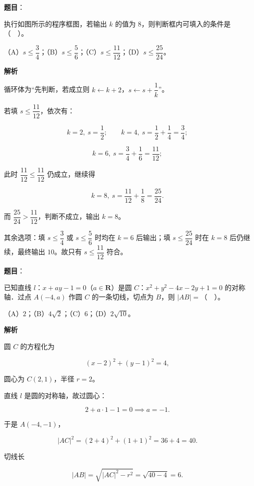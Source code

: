 \begin{answer}

\textbf{题目}：

执行如图所示的程序框图，若输出 $k$ 的值为 $8$，则判断框内可填入的条件是（　）。
\nopagebreak[4]
\begin{center}\end{center}
\nopagebreak[4]
（A）$s\le\dfrac{3}{4}$；（B）$s\le\dfrac{5}{6}$；（C）$s\le\dfrac{11}{12}$；（D）$s\le\dfrac{25}{24}$。

\textbf{解析}

循环体为“先判断，若成立则 $k\leftarrow k+2$，$s\leftarrow s+\dfrac{1}{k}$”。

若填 $s\le\dfrac{11}{12}$，依次有：

\nopagebreak[4]
\[
k=2,\ s=\frac{1}{2};\qquad
k=4,\ s=\frac{1}{2}+\frac{1}{4}=\frac{3}{4};
\]

\nopagebreak[4]
\[
k=6,\ s=\frac{3}{4}+\frac{1}{6}=\frac{11}{12};
\]

此时 $\dfrac{11}{12}\le\dfrac{11}{12}$ 仍成立，继续得

\nopagebreak[4]
\[
k=8,\ s=\frac{11}{12}+\frac{1}{8}=\frac{25}{24}.
\]

而 $\dfrac{25}{24}>\dfrac{11}{12}$，判断不成立，输出 $k=8$。

其余选项：填 $s\le\dfrac{3}{4}$ 或 $s\le\dfrac{5}{6}$ 时均在 $k=6$ 后输出；填 $s\le\dfrac{25}{24}$ 时在 $k=8$ 后仍继续，最终输出 $10$。故只有 $s\le\dfrac{11}{12}$ 符合。


\end{answer}
\begin{answer}

\textbf{题目}：

已知直线 $l$：$x+ay-1=0$（$a\in\mathbf{R}$）是圆 $C$：$x^{2}+y^{2}-4x-2y+1=0$ 的对称轴．过点 $A(-4,a)$ 作圆 $C$ 的一条切线，切点为 $B$，则 $|AB|=$（　）。

（A）$2$；（B）$4\sqrt{2}$；（C）$6$；（D）$2\sqrt{10}$。

\textbf{解析}

圆 $C$ 的方程化为

\nopagebreak[4]
\[
(x-2)^{2}+(y-1)^{2}=4,
\]

圆心为 $C(2,1)$，半径 $r=2$。

直线 $l$ 是圆的对称轴，故过圆心：

\nopagebreak[4]
\[
2+a\cdot 1-1=0\implies a=-1.
\]

于是 $A(-4,-1)$，

\nopagebreak[4]
\[
|AC|^{2}=(2+4)^{2}+(1+1)^{2}=36+4=40.
\]

切线长

\nopagebreak[4]
\[
|AB|=\sqrt{|AC|^{2}-r^{2}}=\sqrt{40-4}=6.
\]


\end{answer}
